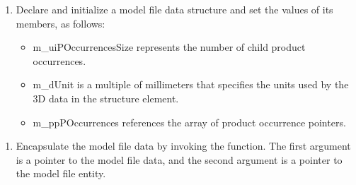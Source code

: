 \documentclass[letterpaper,12pt,english,openany,oneside]{sphinxmanual}
\begin{document}
\begin{sphinxVerbatim}[commandchars=\\\{\}]
   
\end{sphinxVerbatim}
\begin{enumerate}
%
\setcounter{enumi}{2}
\item {} 
Declare and initialize a model file data structure and set the values of its members, as follows:
\begin{itemize}
\item {} 
m\_uiPOccurrencesSize represents the number of child product occurrences.

\item {} 
m\_dUnit is a multiple of millimeters that specifies the units used by the 3D data in the structure element.

\item {} 
m\_ppPOccurrences references the array of product occurrence pointers.

\end{itemize}

\end{enumerate}

\begin{sphinxVerbatim}[commandchars=\\\{\}]
 
  
  
  
\end{sphinxVerbatim}
\begin{enumerate}
%
\setcounter{enumi}{3}
\item {} 
Encapsulate the model file data by invoking the  function. The first argument is a pointer to the model file data, and the second argument is a pointer to the model file entity.

\end{enumerate}
\end{document}
